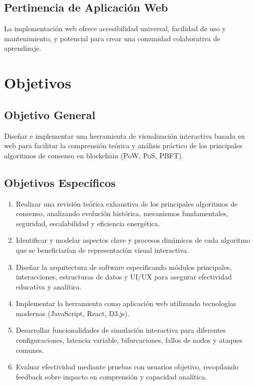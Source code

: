 \documentclass[spanish,12pt,letterpaper]{report}
\begin{document}
\subsection{Pertinencia de Aplicación Web}
La implementación web ofrece accesibilidad universal, facilidad de uso y mantenimiento, y potencial para crear una comunidad colaborativa de aprendizaje.

\section{Objetivos}
\subsection{Objetivo General}
Diseñar e implementar una herramienta de visualización interactiva basada en web para facilitar la comprensión teórica y análisis práctico de los principales algoritmos de consenso en blockchain (PoW, PoS, PBFT).

\subsection{Objetivos Específicos}
\begin{enumerate}
    \item Realizar una revisión teórica exhaustiva de los principales algoritmos de consenso, analizando evolución histórica, mecanismos fundamentales, seguridad, escalabilidad y eficiencia energética.
    
    \item Identificar y modelar aspectos clave y procesos dinámicos de cada algoritmo que se beneficiarían de representación visual interactiva.
    
    \item Diseñar la arquitectura de software especificando módulos principales, interacciones, estructuras de datos y UI/UX para asegurar efectividad educativa y analítica.
    
    \item Implementar la herramienta como aplicación web utilizando tecnologías modernas (JavaScript, React, D3.js).
    
    \item Desarrollar funcionalidades de simulación interactiva para diferentes configuraciones, latencia variable, bifurcaciones, fallos de nodos y ataques comunes.
    
    \item Evaluar efectividad mediante pruebas con usuarios objetivo, recopilando feedback sobre impacto en comprensión y capacidad analítica.
\end{enumerate}


\printbibliography
\end{document}
